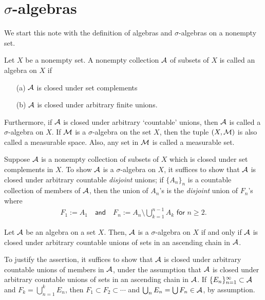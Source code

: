 \section{$\sigma$-algebras}

We start this note with the definition of algebras and $\sigma$-algebras on a nonempty set.
\begin{defi}
    Let $X$ be a nonempty set.
    A nonempty collection ${\mathcal{A}}$ of subsets of $X$ is called an algebra on $X$ if
    \begin{enumerate}
        \item[(a)]
        {
            ${\mathcal{A}}$ is closed under set complements
        }
        \item[(b)]
        {
            ${\mathcal{A}}$ is closed under arbitrary finite unions.
        }
    \end{enumerate}
    Furthermore, if ${\mathcal{A}}$ is closed under arbitrary `countable' unions, then ${\mathcal{A}}$ is called a $\sigma$-algebra on $X$.
    If ${\mathcal{M}}$ is a $\sigma$-algebra on the set $X$, then the tuple $(X, {\mathcal{M}})$ is also called a measurable space.
    Also, any set in ${\mathcal{M}}$ is called a measurable set.
\end{defi}
\begin{rmk}
    Suppose ${\mathcal{A}}$ is a nonempty collection of subsets of $X$ which is closed under set complements in $X$.
    To show ${\mathcal{A}}$ is a $\sigma$-algebra on $X$, it suffices to show that ${\mathcal{A}}$ is closed under arbitrary countable \textit{disjoint} unions; if $\{A_n\}_n$ is a countable collection of members of ${\mathcal{A}}$, then the union of $A_n$'s is the \textit{disjoint} union of $F_n$'s where
    \begin{align*}
        F_1:=A_1\quad\textsf{and}\quad F_n:=A_n\setminus\bigcup_{k=1}^{n-1}A_k\textsf{ for }n\geq 2.
    \end{align*}
\end{rmk}
\begin{rmk}
    Let ${\mathcal{A}}$ be an algebra on a set $X$.
    Then, ${\mathcal{A}}$ is a $\sigma$-algebra on $X$ if and only if ${\mathcal{A}}$ is closed under arbitrary countable unions of sets in an ascending chain in ${\mathcal{A}}$.
    
    To justify the assertion, it suffices to show that ${\mathcal{A}}$ is closed under arbitrary countable unions of members in ${\mathcal{A}}$, under the assumption that ${\mathcal{A}}$ is closed under arbitrary countable unions of sets in an ascending chain in ${\mathcal{A}}$.
    If $\{E_n\}_{n=1}^\infty\subset{\mathcal{A}}$ and $F_k=\bigcup_{n=1}^k E_n$, then $F_1\subset F_2\subset\cdots$ and $\bigcup_n E_n=\bigcup F_n\in{\mathcal{A}}$, by assumption.
\end{rmk}

